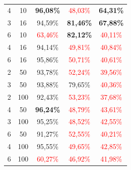 \documentclass[11pt]{article}
\begin{document}
\begin{table}[ht]
\begin{tabular}{cc|c|c|c}
                {4}                           & {10}      & \textbf{96,08\%}                    & \textcolor{red}{48,03\%}            & \textbf{64,31\%}                   \\
                {3}                           & {16}      & {94,59\%}                           & \textbf{81,46\%}                    & \textbf{67,88\%}                   \\
                {6}                           & {10}      & \textcolor{red}{63,46\%}            & \textbf{82,12\%}                    & \textcolor{red}{40,11\%}           \\
                {4}                           & {16}      & {94,14\%}                           & \textcolor{red}{49,81\%}            & \textcolor{red}{40,84\%}           \\
                {6}                           & {16}      & {95,86\%}                           & \textcolor{red}{50,71\%}            & \textcolor{red}{40,61\%}           \\
                {2}                           & {50}      & {93,78\%}                           & \textcolor{red}{52,24\%}            & \textcolor{red}{39,56\%}           \\
                {3}                           & {50}      & {93,88\%}                           & {79,65\%}                           & \textcolor{red}{40,36\%}           \\
                {2}                           & {100}     & {92,43\%}                           & \textcolor{red}{53,23\%}            & \textcolor{red}{37,68\%}           \\
                {4}                           & {50}      & \textbf{96,24\%}                    & \textcolor{red}{48,79\%}            & \textcolor{red}{43,61\%}           \\
                {3}                           & {100}     & {95,25\%}                           & \textcolor{red}{48,52\%}            & \textcolor{red}{42,55\%}           \\
                {6}                           & {50}      & {91,27\%}                           & \textcolor{red}{52,55\%}            & \textcolor{red}{40,21\%}           \\
                {4}                           & {100}     & {95,55\%}                           & \textcolor{red}{49,65\%}            & \textcolor{red}{42,85\%}           \\
                {6}                           & {100}     & \textcolor{red}{60,27\%}            & \textcolor{red}{46,92\%}            & \textcolor{red}{41,98\%}           \\

\end{tabular}
\end{table}
\end{document}
